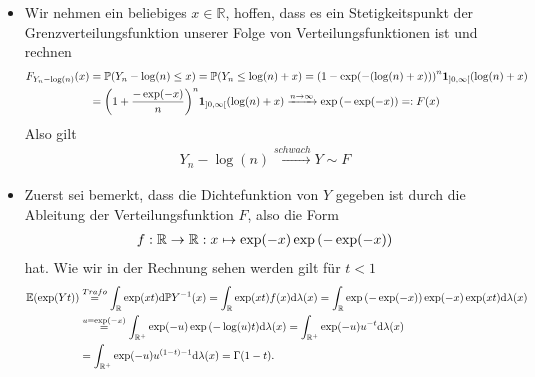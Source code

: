\begin{solution}
\begin{itemize}
    \item[(b)] Wir nehmen ein beliebiges $x \in \mathbb{R}$, hoffen, dass es ein Stetigkeitspunkt der Grenzverteilungsfunktion unserer Folge von Verteilungsfunktionen ist und rechnen
      \begin{align*}
        F_{Y_n - \log(n)}(x) &= \mathbb{P}{\left ( Y_n - \log(n) \leq x \right )} = \mathbb{P}{\left ( Y_n \leq \log(n) + x \right )} = {\left ( 1 - \exp(-{\left ( \log(n) + x \right )}) \right )}^n \mathbf{1}_{]0,\infty[}(\log(n) + x) \\ 
        &= {\left ( 1 + \frac{-\exp(-x)}{n} \right )}^n \mathbf{1}_{]0,\infty[}(\log(n) + x) \xrightarrow{n \to \infty} \exp{\left ( -\exp(-x) \right )} =: F(x)
      \end{align*} 
      Also gilt 
      \begin{align*}
        Y_n - \log(n) \xrightarrow{schwach} Y \sim F
      \end{align*}
    \item[(c)] Zuerst sei bemerkt, dass die Dichtefunktion von $Y$ gegeben ist durch die Ableitung der Verteilungsfunktion $F$, also die Form
    \begin{align*}
      f:\mathbb{R} \to \mathbb{R}: x \mapsto \exp(-x) \exp{\left ( -\exp(-x) \right )}
    \end{align*}
    hat. Wie wir in der Rechnung sehen werden gilt für $t < 1$
      \begin{align*}
        \mathbb{E}(\exp(Yt)) &\stackrel{Trafo}{=} \int_{\mathbb{R}} \exp(xt) \mathrm{d}\mathbb{P}Y^{-1}(x) = \int_{\mathbb{R}} \exp(xt) f(x) \mathrm{d}\lambda(x) = \int_{\mathbb{R}} \exp{\left ( -\exp(-x) \right )} \exp(-x) \exp(xt) \mathrm{d}\lambda(x) \\
        &\stackrel{u = \exp(-x)}{=} \int_{\mathbb{R}^+} \exp(-u) \exp{\left ( -\log(u)t \right )} \mathrm{d}\lambda(x) = \int_{\mathbb{R}^+} \exp(-u) u^{-t} \mathrm{d}\lambda(x) \\
        &= \int_{\mathbb{R}^+} \exp(-u) u^{(1 - t) - 1} \mathrm{d}\lambda(x) = \Gamma(1 - t). 
      \end{align*}
  \end{itemize}
\end{solution}
